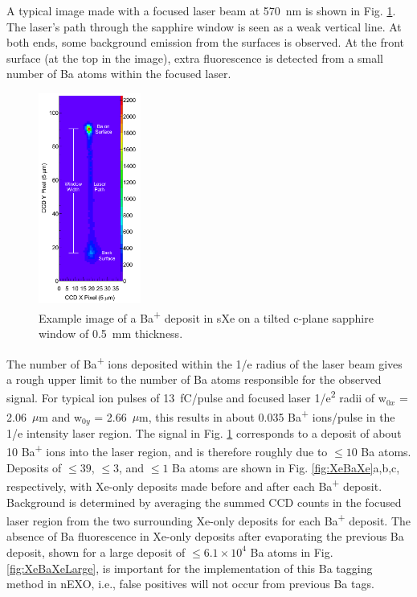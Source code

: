 \documentclass[aps,pra,reprint,superscriptaddress]{revtex4-1}
\begin{document}
A typical image made with a focused laser beam at 570~nm is shown in Fig. \ref{fig:image_example}.  The laser's path through the sapphire window is seen as a weak vertical line.  At both ends, some background emission from the surfaces is observed.  At the front surface (at the top in the image), extra fluorescence is detected from a small number of Ba atoms within the focused laser.

\begin{figure}
\includegraphics[width=0.3\textwidth]{figures/imageExamp_fromthesis.png}
\caption{Example image of a Ba\textsuperscript{+} deposit in sXe on a tilted c-plane sapphire window of 0.5~mm thickness.} %
\label{fig:image_example}
\end{figure}

The number of Ba\textsuperscript{+} ions deposited within the 1/e radius of the laser beam gives a rough upper limit to the number of Ba atoms responsible for the observed signal.  For typical ion pulses of 13~fC/pulse and focused laser 1/e\textsuperscript{2} radii of w$_{0x}$ = 2.06~$\mu$m and w$_{0y}$ = 2.66~$\mu$m, this results in about 0.035 Ba\textsuperscript{+} ions/pulse in the 1/e intensity laser region.  The signal in Fig. \ref{fig:image_example} corresponds to a deposit of about 10 Ba\textsuperscript{+} ions into the laser region, and is therefore roughly due to $\leq 10$ Ba atoms.  Deposits of $\leq 39$, $\leq 3$, and $\leq 1$ Ba atoms are shown in Fig. \ref{fig:XeBaXe}a,b,c, respectively, with Xe-only deposits made before and after each Ba\textsuperscript{+} deposit.  Background is determined by averaging the summed CCD counts in the focused laser region from the two surrounding Xe-only deposits for each Ba\textsuperscript{+} deposit.  The absence of Ba fluorescence in Xe-only deposits after evaporating the previous Ba deposit, shown for a large deposit of $\leq 6.1 \times 10^4$ Ba atoms in Fig. \ref{fig:XeBaXeLarge}, is important for the implementation of this Ba tagging method in nEXO, i.e., false positives will not occur from previous Ba tags.
\end{document}
